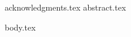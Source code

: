 \documentclass[12pt, pdftex]{report}
\begin{document}

\thesistitlepage
\thesiscopyrightpage

{acknowledgments.tex}
{abstract.tex}

\tableofcontents
\listoffigures
\listoftables

{body.tex}

\glsaddallunused
\printglossaries


\nocite{*}

\end{document}
